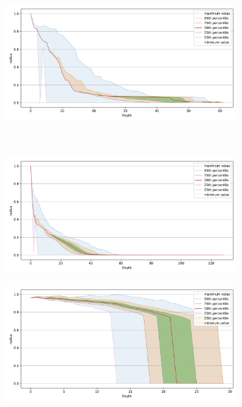 \documentclass[review,supplement,onefignum,onetabnum]{siamonline220329}
\begin{document}
\begin{figure}[ht!]
\begin{subfigure}[b]{0.47\textwidth}
    \label{fig:results:sift-radius}
    \end{subfigure}%
    \begin{subfigure}[b]{0.47\textwidth}
    \includegraphics[width=0.95\textwidth]{images/radius/radio-ml-97920.png}\\
    \label{fig:results:radioml-radius}
    \end{subfigure}%
    \\
    \begin{subfigure}[b]{0.47\textwidth}
    \includegraphics[width=0.95\textwidth]{images/radius/silva-2224640.png}\\
    \label{fig:results:silva-radius}
    \end{subfigure}%
    \begin{subfigure}[b]{0.47\textwidth}
    \includegraphics[width=0.95\textwidth]{images/radius/random-1000000.png}\\

\end{subfigure}
\end{figure}
\end{document}
